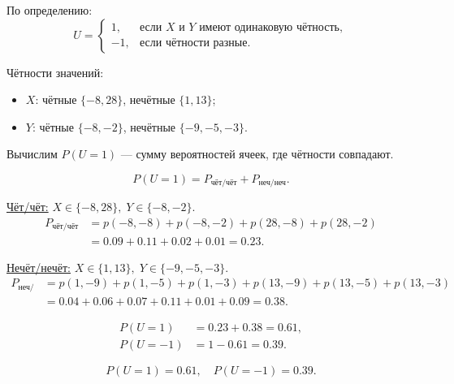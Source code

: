 \documentclass[a4paper,14pt]{extarticle}
\begin{document}
            По определению:
            \[
                U =
                \begin{cases}
                    1, & \text{если } X \text{ и } Y \text{ имеют одинаковую чётность},\\
                    -1, & \text{если чётности разные.}
                \end{cases}
            \]
            
            Чётности значений:
            \begin{itemize}
                \item $X$: чётные $\{-8, 28\}$, нечётные $\{1, 13\}$;
                \item $Y$: чётные $\{-8, -2\}$, нечётные $\{-9, -5, -3\}$.
            \end{itemize}
            
            Вычислим $P(U=1)$ — сумму вероятностей ячеек, где чётности совпадают.
            
            \[
                P(U=1) = P_{\text{чёт/чёт}} + P_{\text{неч/неч}}.
            \]
            
            \noindent\underline{Чёт/чёт:} $X \in \{-8, 28\}, \; Y \in \{-8, -2\}$.
            \[
                \begin{aligned}
                    P_{\text{чёт/чёт}} &= p(-8,-8) + p(-8,-2) + p(28,-8) + p(28,-2) \\
                    &= 0.09 + 0.11 + 0.02 + 0.01 = 0.23.
                \end{aligned}
            \]
            
            \noindent\underline{Нечёт/нечёт:} $X \in \{1, 13\}, \; Y \in \{-9, -5, -3\}$.
            \[
                \begin{aligned}
                    P_{\text{неч/неч}} &= p(1,-9) + p(1,-5) + p(1,-3) + p(13,-9) + p(13,-5) + p(13,-3) \\
                    &= 0.04 + 0.06 + 0.07 + 0.11 + 0.01 + 0.09 = 0.38.
                \end{aligned}
            \]
            
            \[
                \begin{aligned}
                    P(U=1) &= 0.23 + 0.38 = 0.61,\\
                    P(U=-1) &= 1 - 0.61 = 0.39.
                \end{aligned}
            \]
            
            \[
                \boxed{P(U=1)=0.61, \quad P(U=-1)=0.39.}
            \]
            
\end{document}
